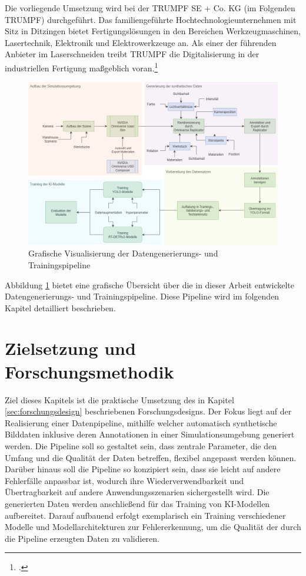 Die vorliegende Umsetzung wird bei der TRUMPF SE + Co. KG (im Folgenden TRUMPF) durchgeführt. Das familiengeführte Hochtechnologieunternehmen mit Sitz in Ditzingen bietet Fertigungslösungen in den Bereichen Werkzeugmaschinen, Lasertechnik, Elektronik und Elektrowerkzeuge an. Als einer der führenden Anbieter im Laserschneiden treibt TRUMPF die Digitalisierung in der industriellen Fertigung maßgeblich voran.\footcite{trumpf_se__co_kg_trumpf_2025}

\begin{figure}[htb]
    \centering
    \includegraphics[width=0.9\linewidth]{graphics/Umsetzung_Diagramm.png}
    \caption{Grafische Visualisierung der Datengenerierungs- und Trainingspipeline}
    \label{fig:visualisierung_umsetzung}
\end{figure}

Abbildung \ref{fig:visualisierung_umsetzung} bietet eine grafische Übersicht über die in dieser Arbeit entwickelte Datengenerierungs- und Trainingspipeline.
Diese Pipeline wird im folgenden Kapitel detailliert beschrieben.

\section{Zielsetzung und Forschungsmethodik}
Ziel dieses Kapitels ist die praktische Umsetzung des in Kapitel \ref{sec:forschungsdesign} beschriebenen Forschungsdesigns. Der Fokus liegt auf der Realisierung einer Datenpipeline, mithilfe welcher automatisch synthetische Bilddaten inklusive deren Annotationen in einer Simulationsumgebung generiert werden. Die Pipeline soll so gestaltet sein, dass zentrale Parameter, die den Umfang und die Qualität der Daten betreffen, flexibel angepasst werden können. Darüber hinaus soll die Pipeline so konzipiert sein, dass sie leicht auf andere Fehlerfälle anpassbar ist, wodurch ihre Wiederverwendbarkeit und Übertragbarkeit auf andere Anwendungsszenarien sichergestellt wird. Die generierten Daten werden anschließend für das Training von \ac{KI}-Modellen aufbereitet. Darauf aufbauend erfolgt exemplarisch ein Training verschiedener Modelle und Modellarchitekturen zur Fehlererkennung, um die Qualität der durch die Pipeline erzeugten Daten zu validieren.

